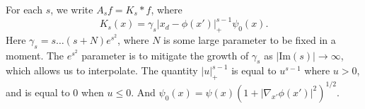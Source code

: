 \begin{example}
  For each $s$, we write $A_sf = K_s * f$, where
  \[ K_s(x) = \gamma_s |x_d - \phi(x')|_+^{s-1} \psi_0(x). \]
  Here $\gamma_s = s \dots (s + N) e^{s^2}$, where $N$ is some large parameter to be fixed in a moment. The $e^{s^2}$ parameter is to mitigate the growth of $\gamma_s$ as $|\text{Im}(s)| \to \infty$, which allows us to interpolate. The quantity $|u|_+^{s-1}$ is equal to $u^{s-1}$ where $u > 0$, and is equal to 0 when $u \leq 0$. And $\psi_0(x) = \psi(x) (1 + |\nabla_{x'} \phi(x')|^2)^{1/2}$.
\end{example} 
